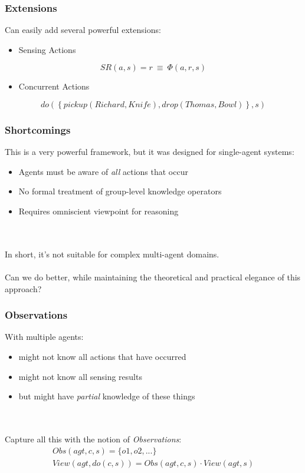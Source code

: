 \documentclass{beamer}
\begin{document}
\begin{frame}
\frametitle{Extensions}
Can easily add several powerful extensions:

\begin{itemize}
\item Sensing Actions
\end{itemize}
\begin{equation*}
SR(a,s)=r\ \equiv\ \Phi(a,r,s)
\end{equation*}

\begin{itemize}
\item Concurrent Actions
\end{itemize}
\begin{equation*}
  do(\left\{pickup(Richard,Knife),drop(Thomas,Bowl)\right\},s)
\end{equation*}
\end{frame}


\begin{frame}
\frametitle{Shortcomings}
This is a very powerful framework, but it was designed for single-agent systems:
\begin{itemize}
 \item Agents must be aware of \emph{all} actions that occur
 \item No formal treatment of group-level knowledge operators
 \item Requires omniscient viewpoint for reasoning
\end{itemize}
\pause
\ \\
\ \\
In short, it's not suitable for complex multi-agent domains.
\ \\
\ \\
Can we do better, while maintaining the theoretical and practical elegance
of this approach?
\end{frame}

\begin{frame}
\frametitle{Observations}

With multiple agents:
\begin{itemize}
\item might not know all actions that have occurred
\item might not know all sensing results
\item but might have \emph{partial} knowledge of these things
\end{itemize}
\ \\
\ \\
\pause
Capture all this with the notion of \emph{Observations}:
\begin{gather*}
  Obs(agt,c,s) = \{o1,o2,...\} \\
  View(agt,do(c,s)) = Obs(agt,c,s) \cdot View(agt,s)
\end{gather*}
\end{frame}
\end{document}
